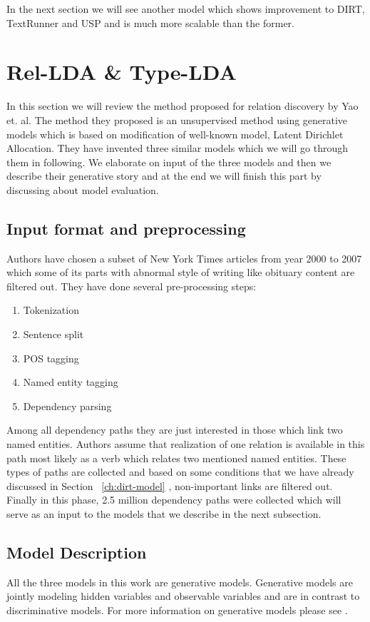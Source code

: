 \documentclass[12pt]{report}
\begin{document}
  In the next section we will see another model which shows improvement to DIRT, TextRunner and USP 
  and is much more scalable than the former.
     

\section{Rel-LDA \& Type-LDA}
\label{ch:unsupervised}

In this section we will review the method proposed for relation discovery  by Yao et. al. \cite{Riedel2013}  
The method they  proposed is an unsupervised method using generative models which is based on 
modification of well-known model, Latent Dirichlet Allocation. 
They have invented three similar models which we will go through them in following. 
We elaborate on input of the three models and then we describe their generative story 
and at the end we will finish this part by discussing about  model evaluation.

\subsection{Input format and preprocessing}
\label{ch:input}
Authors have chosen a subset of New York Times articles from year 2000 to 2007 which some of its parts with
abnormal style of writing like obituary content are filtered out.
They have done several pre-processing steps:
\begin{enumerate}
\item Tokenization
\item Sentence split
\item POS tagging %
\item Named entity tagging %
\item Dependency parsing %
\end{enumerate}
Among all dependency paths they are just interested in those which link two named entities.
 Authors assume that realization of one relation is available in this 
 path most likely as a verb which relates two mentioned named entities. These types of 
 paths are collected and based on some conditions that we have already discussed in Section ~\ref{ch:dirt-model} ,
  non-important links are filtered out.
 Finally in this phase, 2.5 million dependency paths were collected 
 which will serve as an input to the models that we describe in the next subsection.


\subsection {Model Description}
\label{ch:model}
All the three models in this work are generative models. Generative models are jointly modeling hidden variables and observable variables and 
are in contrast to discriminative models. For more information on generative models please see \cite{Murphy2012}.\\
\end{document}
